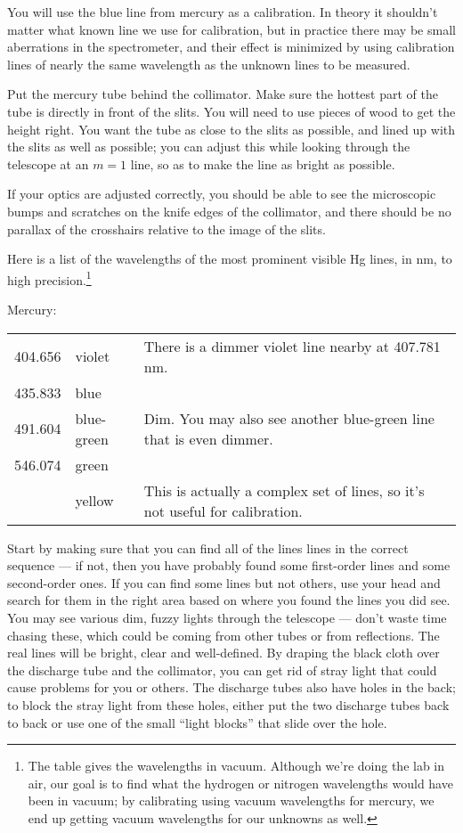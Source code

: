You will use the blue line from mercury as a calibration.
In theory it shouldn't matter what known line we use for calibration, but in practice
there may be small aberrations in the spectrometer, and their effect is minimized by
using calibration lines of nearly the same wavelength as the unknown lines to be measured.

Put the mercury tube behind the collimator. Make sure the
hottest part of the tube is directly in
front of the slits. You will need to use pieces of wood to get the height right.
You want the tube as close to the slits as possible, and
lined up with the slits as well as possible; you can adjust
this while looking through the telescope at an $m=1$ line,
so as to make the line as bright as possible.

If your optics are adjusted correctly,
you should be able to see the microscopic
bumps and scratches on the knife edges of the collimator,
and there should be no parallax of the crosshairs relative
to the image of the slits.

Here is a list of the wavelengths of the most prominent visible Hg lines, in nm, to high 
precision.\footnote{The table gives the wavelengths in vacuum. Although we're doing the lab in air, our goal is to find
what the hydrogen or nitrogen wavelengths would have been in vacuum; by calibrating using vacuum wavelengths
for mercury, we end up getting vacuum wavelengths for our unknowns as well.}

Mercury:\\
\noindent\begin{tabular}{llp{40mm}}
404.656  & violet & There is a dimmer violet line nearby at 407.781 nm.\\
435.833  & blue & \\
491.604  & blue-green & Dim. You may also see another blue-green line that is even dimmer. \\
546.074  & green & \\
         & yellow & This is actually a complex set of lines, so it's not useful for calibration.
\end{tabular}

Start by making sure
that you can find all of the lines lines in the correct sequence --- if
not, then you have probably found some first-order
lines and some second-order ones. If you can find some lines
but not others, use your head and search for them in the
right area based on where you found the lines you did see.
You may see various dim, fuzzy lights through the telescope
--- don't waste time chasing these, which could be coming
from other tubes or from reflections. The real lines will be
bright, clear and well-defined. By draping the black cloth over
the discharge tube and the collimator, you can get rid of stray
light that could cause problems for you or others. The discharge tubes also have
holes in the back; to block the stray
light from these holes, either put the two discharge tubes back
to back or use one of the small ``light blocks'' that slide over the hole.

